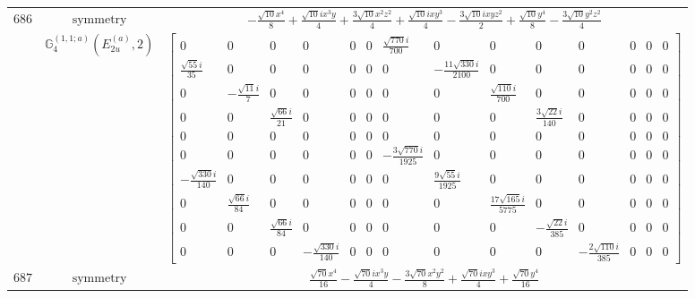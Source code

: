 \documentclass[fleqn,8pt,landscape]{jsarticle}
\begin{document}
\begin{longtable}{ccc}
$ 686 $ & $ \text{symmetry} $ & $ - \frac{\sqrt{10} x^{4}}{8} + \frac{\sqrt{10} i x^{3} y}{4} + \frac{3 \sqrt{10} x^{2} z^{2}}{4} + \frac{\sqrt{10} i x y^{3}}{4} - \frac{3 \sqrt{10} i x y z^{2}}{2} + \frac{\sqrt{10} y^{4}}{8} - \frac{3 \sqrt{10} y^{2} z^{2}}{4} $ \\
$  $ & $ \mathbb{G}_{4}^{(1,1;a)}(E_{2u}^{(a)},2) $ & $ \begin{bmatrix} 0 & 0 & 0 & 0 & 0 & 0 & \frac{\sqrt{770} i}{700} & 0 & 0 & 0 & 0 & 0 & 0 & 0 \\ \frac{\sqrt{55} i}{35} & 0 & 0 & 0 & 0 & 0 & 0 & - \frac{11 \sqrt{330} i}{2100} & 0 & 0 & 0 & 0 & 0 & 0 \\ 0 & - \frac{\sqrt{11} i}{7} & 0 & 0 & 0 & 0 & 0 & 0 & \frac{\sqrt{110} i}{700} & 0 & 0 & 0 & 0 & 0 \\ 0 & 0 & \frac{\sqrt{66} i}{21} & 0 & 0 & 0 & 0 & 0 & 0 & \frac{3 \sqrt{22} i}{140} & 0 & 0 & 0 & 0 \\ 0 & 0 & 0 & 0 & 0 & 0 & 0 & 0 & 0 & 0 & 0 & 0 & 0 & 0 \\ 0 & 0 & 0 & 0 & 0 & 0 & - \frac{3 \sqrt{770} i}{1925} & 0 & 0 & 0 & 0 & 0 & 0 & 0 \\ - \frac{\sqrt{330} i}{140} & 0 & 0 & 0 & 0 & 0 & 0 & \frac{9 \sqrt{55} i}{1925} & 0 & 0 & 0 & 0 & 0 & 0 \\ 0 & \frac{\sqrt{66} i}{84} & 0 & 0 & 0 & 0 & 0 & 0 & \frac{17 \sqrt{165} i}{5775} & 0 & 0 & 0 & 0 & 0 \\ 0 & 0 & \frac{\sqrt{66} i}{84} & 0 & 0 & 0 & 0 & 0 & 0 & - \frac{\sqrt{22} i}{385} & 0 & 0 & 0 & 0 \\ 0 & 0 & 0 & - \frac{\sqrt{330} i}{140} & 0 & 0 & 0 & 0 & 0 & 0 & - \frac{2 \sqrt{110} i}{385} & 0 & 0 & 0 \end{bmatrix} $ \\ \hline
$ 687 $ & $ \text{symmetry} $ & $ \frac{\sqrt{70} x^{4}}{16} - \frac{\sqrt{70} i x^{3} y}{4} - \frac{3 \sqrt{70} x^{2} y^{2}}{8} + \frac{\sqrt{70} i x y^{3}}{4} + \frac{\sqrt{70} y^{4}}{16} $ \\

\end{longtable}
\end{document}

